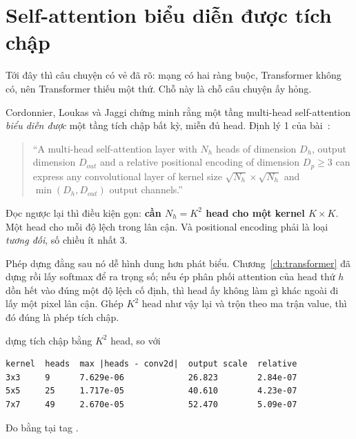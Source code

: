 \section{Self-attention biểu diễn được tích chập}
\label{sec:ch10-attention-lam-duoc}

%
Tới đây thì câu chuyện có vẻ đã rõ: mạng  có hai
ràng buộc, Transformer không có, nên Transformer thiếu một thứ. Chỗ này là chỗ
câu chuyện ấy hỏng.

Cordonnier, Loukas và Jaggi chứng minh rằng một tầng multi-head self-attention
\emph{biểu diễn được} một tầng tích chập bất kỳ, miễn đủ head. Định lý 1 của
bài~\autocite{cordonnier2020relationship}:

\begin{quote}
\enquote{A multi-head self-attention layer with \(N_h\) heads of dimension
\(D_h\), output dimension \(D_{out}\) and a relative positional encoding of
dimension \(D_p \geq 3\) can express any convolutional layer of kernel size
\(\sqrt{N_h} \times \sqrt{N_h}\) and \(\min(D_h, D_{out})\) output channels.}
\end{quote}

Đọc ngược lại thì điều kiện gọn: \textbf{cần \(N_h = K^2\) head cho một kernel
\(K \times K\)}. Một head cho mỗi độ lệch trong lân cận. Và positional encoding
phải là loại \emph{tương đối}, số chiều ít nhất 3.

Phép dựng đằng sau nó dễ hình dung hơn phát biểu. Chương~\ref{ch:transformer}
đã dựng  rồi lấy softmax để ra trọng số; nếu ép phân phối
attention của head thứ \(h\) dồn hết vào đúng một độ lệch cố định, thì head ấy
không làm gì khác ngoài đi lấy một pixel lân cận. Ghép \(K^2\) head như vậy lại
và trộn theo ma trận value, thì đó đúng là phép tích chập.

\begin{measured}{dựng tích chập bằng \(K^2\) head, so với }
\begin{verbatim}
kernel  heads  max |heads - conv2d|  output scale  relative
3x3     9      7.629e-06             26.823        2.84e-07
5x5     25     1.717e-05             40.610        4.23e-07
7x7     49     2.670e-05             52.470        5.09e-07
\end{verbatim}

Đo bằng  tại tag .
\end{measured}

